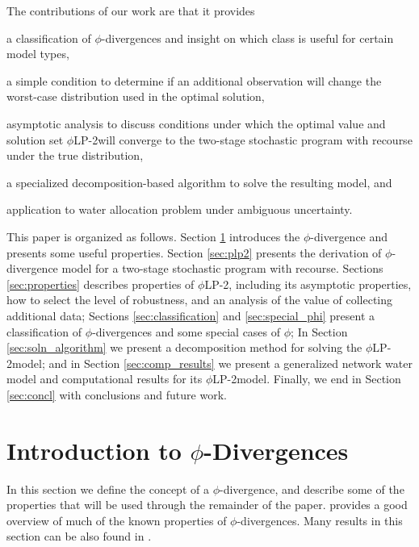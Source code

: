 \documentclass[ijoc,nonblindrev]{informs3} %
\newcommand{\plp}{$\phi$LP-2}
\begin{document}
The contributions of our work are that it provides
\begin{inparaenum}
	\item a classification of $\phi$-divergences and insight on which class is useful for certain model types,
	\item a simple condition to determine if an additional observation will change the worst-case distribution used in the optimal solution, 
	\item asymptotic analysis to discuss conditions under which the optimal value and solution set \plp will converge to the two-stage stochastic program with recourse under the true distribution, 
	\item a specialized decomposition-based algorithm to solve the resulting model,  and 
	\item application to water allocation problem under ambiguous uncertainty. 
\end{inparaenum}

This paper is organized as follows.
Section \ref{sec:phi_divergences} introduces the $\phi$-divergence and presents some useful properties.
Section \ref{sec:plp2} presents the derivation of $\phi$-divergence model for a two-stage stochastic program with recourse.
Sections \ref{sec:properties} describes properties of \plp, including its asymptotic properties, how to select the level of robustness, and an analysis of the value of collecting additional data;
Sections \ref{sec:classification} and \ref{sec:special_phi} present a classification of $\phi$-divergences and some special cases of $\phi$; 
In Section \ref{sec:soln_algorithm} we present a decomposition method for solving the \plp model; and in Section \ref{sec:comp_results} we present a generalized network water model and computational results for its \plp model.
Finally, we end in Section \ref{sec:concl} with conclusions and future work.

\section{Introduction to $\phi$-Divergences}
\label{sec:phi_divergences}

In this section we define the concept of a $\phi$-divergence, and describe some of the properties that will be used through the remainder of the paper.
\cite{pardo2005statistical} provides a good overview of much of the known properties of $\phi$-divergences.
Many results in this section can be also found in \cite{bental2011robust}.
\end{document}
